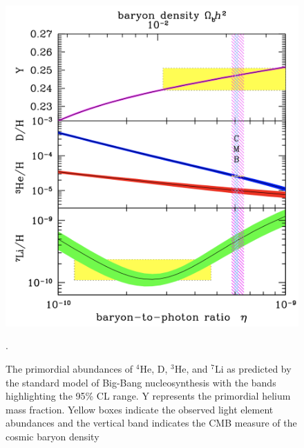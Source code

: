 \begin{figure}[ht!]
    \begin{center}
        \includegraphics[scale=0.45]{Chapter_1/Figures/BBN_primordial_abundance.jpg}
        \caption[The primordial abundances of $^4$He, D, $^3$He, and $^7$Li as predicted by the standard model of Big-Bang nucleosynthesis]%
        {The primordial abundances of $^4$He, D, $^3$He, and $^7$Li as predicted by the standard model of Big-Bang nucleosynthesis with the bands highlighting the 95\% CL range. Y represents the primordial helium mass fraction. Yellow boxes indicate the observed light element abundances and the vertical band indicates the CMB measure of the cosmic baryon density \cite{BBN_figure}}.
        \label{fig:primordial_abundance}
        \end{center}
\end{figure}


